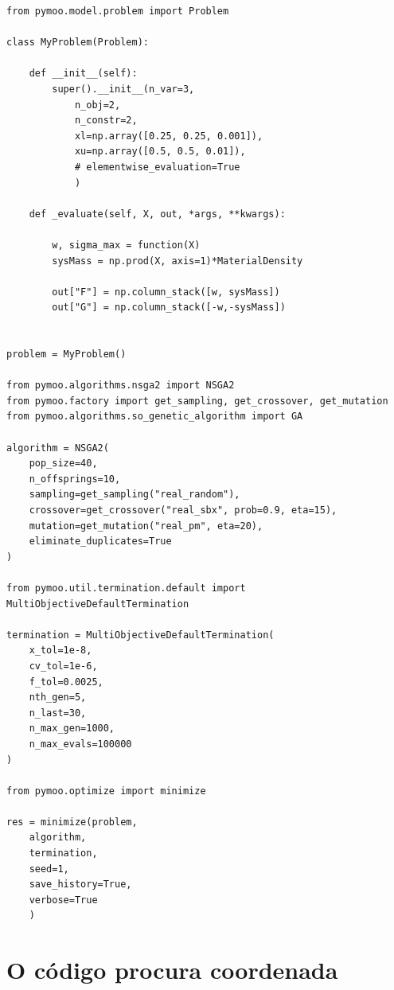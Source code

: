 \documentclass[a4paper,12pt]{article}
\begin{document}
\begin{verbatim}
from pymoo.model.problem import Problem

class MyProblem(Problem):

	def __init__(self):
		super().__init__(n_var=3, 
			n_obj=2,
			n_constr=2,
			xl=np.array([0.25, 0.25, 0.001]),
			xu=np.array([0.5, 0.5, 0.01]),
			# elementwise_evaluation=True
			)

	def _evaluate(self, X, out, *args, **kwargs):

		w, sigma_max = function(X) 
		sysMass = np.prod(X, axis=1)*MaterialDensity

		out["F"] = np.column_stack([w, sysMass])
		out["G"] = np.column_stack([-w,-sysMass])


problem = MyProblem()

from pymoo.algorithms.nsga2 import NSGA2
from pymoo.factory import get_sampling, get_crossover, get_mutation
from pymoo.algorithms.so_genetic_algorithm import GA

algorithm = NSGA2(
	pop_size=40,
	n_offsprings=10,
	sampling=get_sampling("real_random"),
	crossover=get_crossover("real_sbx", prob=0.9, eta=15),
	mutation=get_mutation("real_pm", eta=20),
	eliminate_duplicates=True
)

from pymoo.util.termination.default import MultiObjectiveDefaultTermination

termination = MultiObjectiveDefaultTermination(
    x_tol=1e-8,
    cv_tol=1e-6,
    f_tol=0.0025,
    nth_gen=5,
    n_last=30,
    n_max_gen=1000,
    n_max_evals=100000
)

from pymoo.optimize import minimize

res = minimize(problem, 
	algorithm, 
	termination, 
	seed=1, 
	save_history=True, 
	verbose=True
	)
\end{verbatim}

\newpage

\section{O código procura coordenada}\label{A:1}
\end{document}
